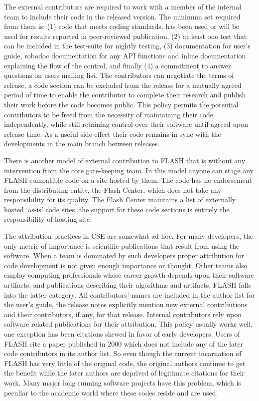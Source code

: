 The external contributors are required to work with a member of the
internal team to include their code in the released version. The
minimum set required from them is:  (1) code that meets coding standards,
has been used or will be used for results reported in peer-reviewed
publication, (2) at least one test that can be included in the
test-suite for nightly testing, (3) documentation for user's guide,
robodoc documentation for any API functions and inline documentation
explaining the flow of the control, and finally (4) a commitment to answer
questions on users mailing list. The contributors can negotiate the
terms of release, a code section can be excluded from the release for
a mutually agreed period of time to enable the contributor to complete
their research and publish their work before the code becomes
public. This policy permits the potential contributors to be freed
from the necessity of maintaining their code independently, while
still retaining control over their software until agreed upon
release time.  As a useful side effect their code remains in sync with
the developments in the main branch between releases.  

There is another model of external contribution to FLASH that is
without any intervention from the core gate-keeping team. In this
model anyone can stage any FLASH compatible code on a site hosted by
them. The code has no endorsement from the distributing entity, the
Flash Center, which does not take any responsibility for its
quality. The Flash Center maintains a list of externally hosted
`as-is' code sites, the support for these code sections is entirely
the responsibility of hosting site. 

The attribution practices in CSE are somewhat ad-hoc. For many
developers, the only metric of importance is scientific
publications that result from using the software. When a team is
dominated by such developers proper attribution for code development
is not given enough importance or thought. Other teams also employ
computing professionals whose career growth depends upon their
software artifacts, and publications describing their algorithms and
artifacts, FLASH falls into the latter category. All 
contributors' names are included in the author list for the user's
guide, the release notes explicitly mention new external
contributions and their contributors, if any, for that
release. Internal contributors rely upon software related publications
for their attribution. This policy  usually works well, one
exception  has been citations skewed in favor of early
developers. Users of FLASH cite a paper published in 2000
\cite{Fryxell2000} which does not include any of the later code
contributors in its author list.  So even though the current
incarnation of FLASH has very little of the original code, the
original authors continue to get the benefit while the later authors
are deprived of legitimate citations for their work.  Many major long
running software projects have this problem, which is peculiar to the academic world where these
codes reside and are used.  

